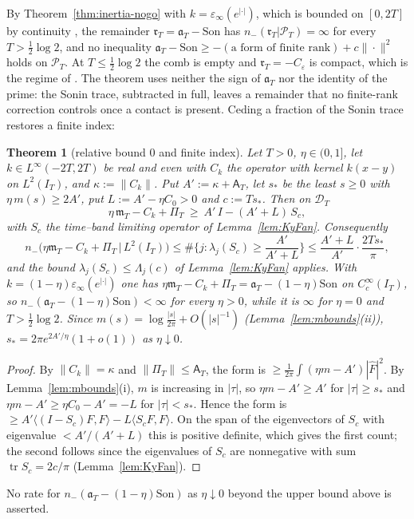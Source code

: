 \documentclass[11pt]{amsart}
\newtheorem{theorem}{Theorem}[section]
\theoremstyle{definition}
\theoremstyle{remark}
\newcommand{\PT}{\mathcal P_T}
\newcommand{\IT}{I_T}
\newcommand{\Fh}{\widehat F}
\newcommand{\Aconst}{\mathsf A_T}
\newcommand{\PiT}{\Pi_T}
\newcommand{\mT}{\mathfrak m_T}
\begin{document}
By Theorem~\ref{thm:inertia-nogo} with $k=\varepsilon_\infty(e^{|\cdot|})$, which is bounded on $[0,2T]$ by continuity
\cite[(84)]{ConnesConsani2021}, the remainder $\mathfrak r_T=\mathfrak a_T-\mathrm{Son}$ has $n_-(\mathfrak r_T|\PT)=\infty$ for every
$T>\frac12\log2$, and no inequality $\mathfrak a_T-\mathrm{Son}\ge-(\text{a form of finite rank})+c\|\cdot\|^2$ holds on $\PT$. At
$T\le\frac12\log2$ the comb is empty and $\mathfrak r_T=-C_\varepsilon$ is compact, which is the regime of
\cite[\S6]{ConnesConsani2021}. The theorem uses neither the sign of $\mathfrak a_T$ nor the identity of the prime: the
Sonin trace, subtracted in full, leaves a remainder that no finite-rank correction controls once a contact is
present. Ceding a fraction of the Sonin trace restores a finite index:

\begin{theorem}[relative bound $0$ and finite index]\label{thm:inertia-finite}
Let $T>0$, $\eta\in(0,1]$, let $k\in L^\infty(-2T,2T)$ be real and even with $C_k$ the operator with kernel $k(x-y)$ on
$L^2(\IT)$, and $\kappa:=\|C_k\|$. Put $A':=\kappa+\Aconst$, let $s_*$ be the least $s\ge0$ with $\eta\,m(s)\ge2A'$, put
$L:=A'-\eta C_0>0$ and $c:=Ts_*$. Then on $\mathcal D_T$
\[
\eta\,\mT-C_k+\PiT\ \ge\ A'\,I-(A'+L)\,S_c ,
\]
with $S_c$ the time--band limiting operator of Lemma~\ref{lem:KyFan}. Consequently
\[
n_-\big(\eta\mT-C_k+\PiT\,\big|\,L^2(\IT)\big)\le\#\Big\{j:\lambda_j(S_c)\ge\frac{A'}{A'+L}\Big\}
\le\frac{A'+L}{A'}\cdot\frac{2Ts_*}{\pi},
\]
and the bound $\lambda_j(S_c)\le\Lambda_j(c)$ of Lemma~\ref{lem:KyFan} applies. With $k=(1-\eta)\varepsilon_\infty(e^{|\cdot|})$
one has $\eta\mT-C_k+\PiT=\mathfrak a_T-(1-\eta)\mathrm{Son}$ on $C_c^\infty(\IT)$, so
$n_-(\mathfrak a_T-(1-\eta)\mathrm{Son})<\infty$ for every $\eta>0$, while it is $\infty$ for $\eta=0$ and $T>\frac12\log2$.
Since $m(s)=\log\frac{|s|}{2\pi}+O(|s|^{-1})$ (Lemma~\ref{lem:mbounds}(ii)), $s_*=2\pi e^{2A'/\eta}(1+o(1))$ as
$\eta\downarrow0$.
\end{theorem}
\begin{proof}
By $\|C_k\|=\kappa$ and $\|\PiT\|\le\Aconst$, the form is $\ge\frac1{2\pi}\int(\eta m-A')|\Fh|^2$. By
Lemma~\ref{lem:mbounds}(i), $m$ is increasing in $|\tau|$, so $\eta m-A'\ge A'$ for $|\tau|\ge s_*$ and
$\eta m-A'\ge\eta C_0-A'=-L$ for $|\tau|<s_*$. Hence the form is $\ge A'\langle(I-S_c)F,F\rangle-L\langle S_cF,F\rangle$. On the
span of the eigenvectors of $S_c$ with eigenvalue $<A'/(A'+L)$ this is positive definite, which gives the first count;
the second follows since the eigenvalues of $S_c$ are nonnegative with sum $\operatorname{tr}S_c=2c/\pi$ (Lemma~\ref{lem:KyFan}).
\end{proof}
No rate for $n_-(\mathfrak a_T-(1-\eta)\mathrm{Son})$ as $\eta\downarrow0$ beyond the upper bound above is asserted.
\end{document}
